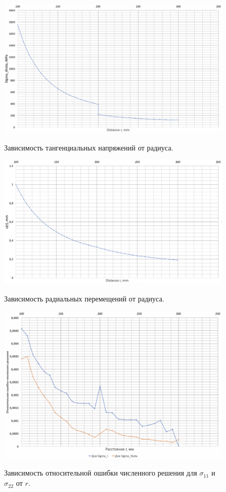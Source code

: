 \documentclass[a4paper,12pt]{article}	%
\begin{document}
\begin{figure}[H]
  \centering
  \includegraphics[scale=0.5]{img/Sigma_theta_2.png}\\
  \caption{Зависимость тангенциальных напряжений от радиуса.}
  \label{fig_16}
\end{figure}

\begin{figure}[H]
  \centering
  \includegraphics[scale=0.5]{img/u_r.png}\\
  \caption{Зависимость радиальных перемещений от радиуса.}
  \label{fig_17}
\end{figure}

\begin{figure}[H]
  \centering
  \includegraphics[scale=0.5]{img/error_Stress.png}\\
  \caption{Зависимость относительной ошибки численного решения для $\sigma_{11}$ и $\sigma_{22}$ от $r$.}
  \label{fig_18}
\end{figure}
\end{document}
